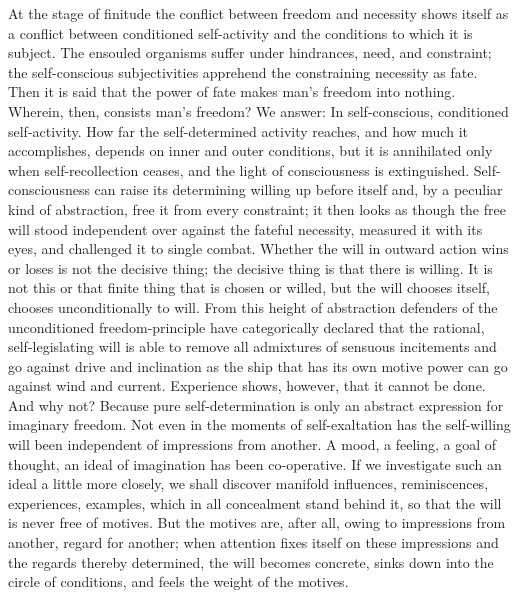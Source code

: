 \documentclass[12pt]{article}
\begin{document}
At the stage of finitude the conflict between freedom and necessity shows
itself as a conflict between conditioned self-activity and the conditions to
which it is subject. The ensouled organisms suffer under hindrances, need,
and constraint; the self-conscious subjectivities apprehend the constraining
necessity as fate. Then it is said that the power of fate makes man's freedom
into
nothing. Wherein, then, consists man's freedom? We answer: In self-conscious,
conditioned self-activity. How far the self-determined activity reaches, and
how much it accomplishes, depends on inner and outer conditions, but it is
annihilated only when self-recollection ceases, and the light of
consciousness is extinguished. Self-consciousness can raise its determining
willing up before itself and, by a peculiar kind of abstraction, free it from
every constraint; it then looks as though the free will stood independent
over against the fateful necessity, measured it with its eyes, and challenged
it to single combat. Whether the will in outward action wins or loses is not
the decisive thing; the decisive thing is that there is willing. It is not
this or that finite thing that is chosen or willed, but the will chooses
itself, chooses unconditionally to will. From this height of abstraction
defenders of the unconditioned freedom-principle have categorically declared
that the rational, self-legislating will is able to remove all admixtures of
sensuous incitements and go against drive and inclination as the ship that
has its own motive power can go against wind and current. Experience shows,
however, that it cannot be done. And why not? Because pure self-determination
is only an abstract expression for imaginary freedom. Not even in the moments
of self-exaltation has the self-willing will been independent of impressions
from another. A mood, a feeling, a goal of thought, an ideal of imagination
has been co-operative. If we investigate such an ideal a little more closely,
we shall discover manifold influences, reminiscences, experiences, examples,
which in all concealment stand behind it, so that the will is never free of
motives. But the motives are, after all, owing to impressions from another,
regard for another; when attention fixes itself on these impressions and the
regards thereby determined, the will becomes concrete, sinks down into the
circle of conditions, and feels the weight of the motives.
\end{document}
